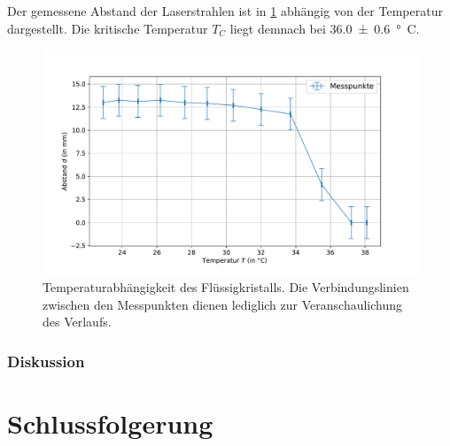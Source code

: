 \documentclass[
	a4paper,
	12pt,
	pagesize,
	ngerman
]{scrartcl}
\begin{document}
	Der gemessene Abstand der Laserstrahlen ist in \cref{fig_laser} abhängig von der Temperatur dargestellt.
	Die kritische Temperatur $T_C$ liegt demnach bei \SI{36.0+-0.6}{\degree C}.
		\begin{figure}[H]
			\includegraphics[width=1\linewidth]{images/laser.pdf}
			\caption{
			Temperaturabhängigkeit des Flüssigkristalls.
			Die Verbindungslinien zwischen den Messpunkten dienen lediglich zur Veranschaulichung des Verlaufs. %
			}
			\label{fig_laser}
	\end{figure}
	\subsubsection{Diskussion}



	\section{Schlussfolgerung}



\end{document}
